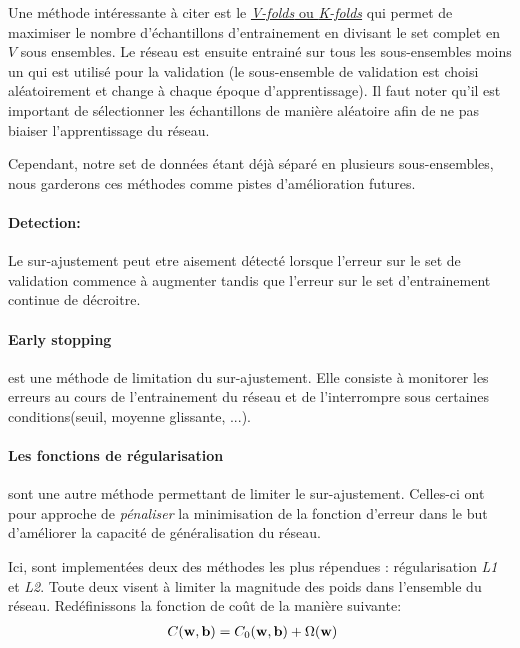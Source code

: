 \documentclass[11pt]{article}
\begin{document}
Une m\'ethode int\'eressante \`a citer est le \href{http://work.caltech.edu/slides/slides13.pdf}
{\emph{V-folds} ou \emph{K-folds}} qui permet de maximiser le nombre d'\'echantillons
d'entrainement en divisant le set complet en $V$ sous ensembles. Le r\'eseau est
ensuite entrain\'e sur tous les sous-ensembles moins un qui est utilis\'e pour la
validation (le sous-ensemble de validation est choisi al\'eatoirement et change
\`a chaque \'epoque d'apprentissage). Il faut noter qu'il est important de
s\'electionner les \'echantillons de mani\`ere al\'eatoire afin de ne pas biaiser
l'apprentissage du r\'eseau.

Cependant, notre set de donn\'ees \'etant d\'ej\`a s\'epar\'e en plusieurs sous-ensembles,
nous garderons ces m\'ethodes comme pistes d'am\'elioration futures.

\paragraph{Detection: }Le sur-ajustement peut etre aisement d\'etect\'e lorsque
l'erreur sur le set de validation commence \`a augmenter tandis que l'erreur sur
le set d'entrainement continue de d\'ecroitre.

\paragraph{Early stopping} est une m\'ethode de limitation du sur-ajustement. Elle
consiste \`a monitorer les erreurs au cours de l'entrainement du r\'eseau et
de l'interrompre sous certaines conditions(seuil, moyenne glissante, ...).

\paragraph{Les fonctions de r\'egularisation} sont une autre m\'ethode permettant
de limiter le sur-ajustement. Celles-ci ont pour approche de {\em p\'enaliser}
la minimisation de la fonction d'erreur dans le but d'am\'eliorer la capacit\'e de
g\'en\'eralisation du r\'eseau.

Ici, sont implement\'ees deux des m\'ethodes les plus r\'ependues :
r\'egularisation \emph{L1} et \emph{L2}. Toute deux visent \`a limiter
la magnitude des poids dans l'ensemble du r\'eseau.
Red\'efinissons la fonction de co\^ut de la mani\`ere suivante:
\begin{equation}
	\begin{aligned}
		C({\bf w}, {\bf b}) &= C_0({\bf w}, {\bf b}) + \Omega({\bf w})
	\end{aligned}
\end{equation}
\end{document}
